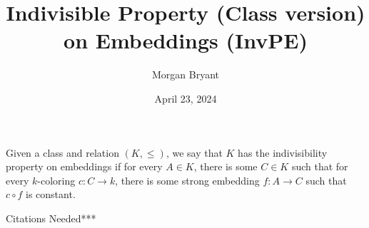 \documentclass[a4paper]{article}
\title{Indivisible Property (Class version) on Embeddings (InvPE)}
\date{April 23, 2024}
\author{Morgan Bryant}
\begin{document}
\maketitle
\par{Given a class and relation \((K, \leq )\), we say that \(K\) has the indivisibility property on embeddings if for every \(A  \in  K\), there is some \(C \in  K\)
such that for every \(k\)-coloring \(c: C \rightarrow  k\), there is some strong embedding \(f:A \rightarrow  C\) such that \(c \circ  f\) is constant.}\par{Citations Needed***}
\printbibliography
\end{document}

